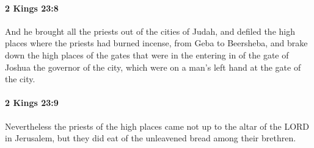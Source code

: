 		\paragraph{2 Kings 23:8} %
			\label{2KINGS-23-8}

			And he brought all the priests out of the cities of Judah, and defiled the high places where the priests had burned incense, from Geba to Beersheba, and brake down the high places of the gates that were in the entering in of the gate of Joshua the governor of the city, which were on a man’s left hand at the gate of the city.


		\paragraph{2 Kings 23:9} %
			\label{2KINGS-23-9}

			Nevertheless the priests of the high places came not up to the altar of the LORD in Jerusalem, but they did eat of the unleavened bread among their brethren.

